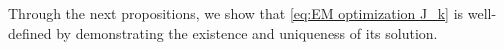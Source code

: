 Through the next propositions, we show that \eqref{eq:EM optimization J_k} is well-defined by demonstrating the existence and uniqueness of its solution. 

